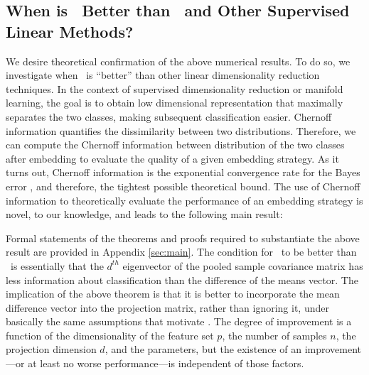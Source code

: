 \documentclass[11pt]{extarticle}
\begin{document}


\subsection*{When is \Lol~Better than \Pca~and Other Supervised Linear Methods?}


We desire theoretical confirmation of the above numerical results.
To do so, we investigate when \Lol~is ``better'' than other linear dimensionality reduction techniques.
In the context of supervised dimensionality reduction or manifold learning, the goal is to obtain low dimensional representation that maximally separates the two classes, making subsequent classification easier.  Chernoff information quantifies the dissimilarity between two distributions. Therefore, we can compute the Chernoff information between distribution of the two classes after embedding to evaluate the quality of a given embedding strategy.
As it turns out, Chernoff information  is the exponential convergence rate for the Bayes error \cite{chernoff_1952}, and therefore, the tightest possible theoretical bound.   The use of Chernoff information to theoretically evaluate the performance of an embedding strategy is novel, to our knowledge, and leads to the following main result:



Formal statements of the theorems and proofs required to substantiate the above result are provided in Appendix \ref{sec:main}.  The condition for \Lol~to be better than \Pca~is essentially that the $d^{th}$ eigenvector of the pooled sample covariance matrix has less information about classification than the difference of the means vector.
% 
The implication of the above theorem is that it is better to incorporate the mean difference vector into the projection matrix, rather than ignoring it, under basically the same assumptions that motivate \Pca.  The {degree} of improvement is a function of 
the  dimensionality of the feature set $p$, 
the number of samples $n$, 
the projection dimension $d$, 
and the parameters, but the {existence} of an improvement---or at least no worse performance---is independent of those factors.
\end{document}
